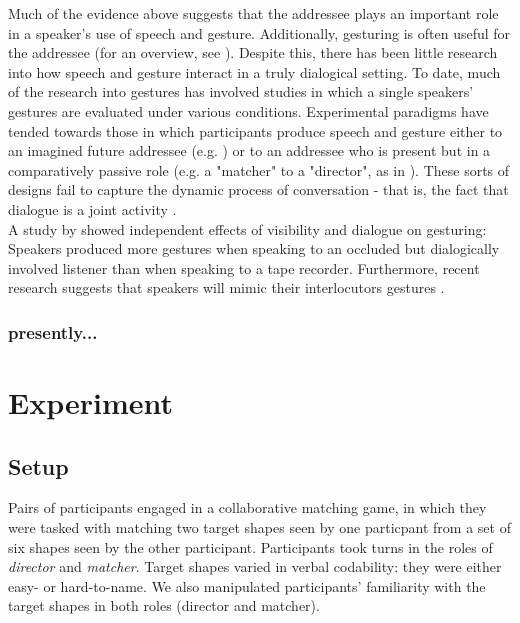 \documentclass[a4paper,man,natbib]{apa6}
\newcommand*{\term}[1]{\emph{#1}} %
\begin{document}
Much of the evidence above suggests that the addressee plays an important role in a speaker's use of speech and gesture.
Additionally, gesturing is often useful for the addressee (for an overview, see \citet{Hostetter2011}). 
Despite this, there has been little research into how speech and gesture interact in a truly dialogical setting.
To date, much of the research into gestures has involved studies in which a single speakers' gestures are evaluated under various conditions.
Experimental paradigms have tended towards those in which participants produce speech and gesture either to an imagined future addressee (e.g. \citet{Wesp2001, Morsella2004}) or to an addressee who is present but in a comparatively passive role (e.g. a "matcher" to a "director", as in \citet{Bangerter2004, Holler2007, DeRuiter2012, Hoetjes2015}).
These sorts of designs fail to capture the dynamic process of conversation - that is, the fact that dialogue is a joint activity \citep{Clark1996}.\\

A study by \citeauthor{Bavelas2008} showed independent effects of visibility and dialogue on gesturing:
Speakers produced more gestures when speaking to an occluded but dialogically involved listener than when speaking to a tape recorder. 
Furthermore, recent research suggests that speakers will mimic their interlocutors gestures \citep{Kimbara2008, Holler2011}. %



\subsubsection{presently...}










\section{Experiment}

\subsection{Setup}
Pairs of participants engaged in a collaborative matching game, in which they were tasked with matching two target shapes seen by one particpant from a set of six shapes seen by the other participant. 
Participants took turns in the roles of \term{director} and \term{matcher}.
Target shapes varied in verbal codability: they were either easy- or hard-to-name.
We also manipulated participants' familiarity with the target shapes in both roles (director and matcher).
\end{document}
